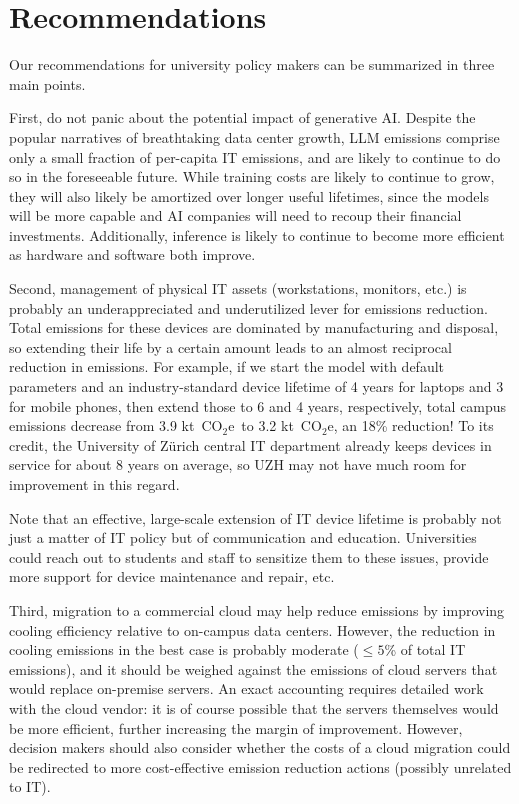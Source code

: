 \documentclass[11pt]{article}
\newcommand{\coe}{CO$_2$e}
\newcommand{\tcoe}{t~\coe}
\begin{document}
\section{Recommendations}
\label{sec:recommendations}

Our recommendations for university policy makers can be summarized in three main points.

First, do not panic about the potential impact of generative AI. Despite the popular narratives of breathtaking data center growth, LLM emissions comprise only a small fraction of per-capita IT emissions, and are likely to continue to do so in the foreseeable future. While training costs are likely to continue to grow, they will also likely be amortized over longer useful lifetimes, since the models will be more capable and AI companies will need to recoup their financial investments. Additionally, inference is likely to continue to become more efficient as hardware and software both improve.

Second, management of physical IT assets (workstations, monitors, etc.) is probably an underappreciated and underutilized lever for emissions reduction. Total emissions for these devices are dominated by manufacturing and disposal, so extending their life by a certain amount leads to an almost reciprocal reduction in emissions. For example, if we start the model with default parameters and an industry-standard device lifetime of 4 years for laptops and 3 for mobile phones, then extend those to 6 and 4 years, respectively, total campus emissions decrease from 3.9 k\tcoe\ to 3.2 k\tcoe, an 18\% reduction! To its credit, the University of Zürich central IT department already keeps devices in service for about 8 years on average, so UZH may not have much room for improvement in this regard.

Note that an effective, large-scale extension of IT device lifetime is probably not just a matter of IT policy but of communication and education. Universities could reach out to students and staff to sensitize them to these issues, provide more support for device maintenance and repair, etc.

Third, migration to a commercial cloud may help reduce emissions by improving cooling efficiency relative to on-campus data centers. However, the reduction in cooling emissions in the best case is probably moderate ($\le 5$\% of total IT emissions), and it should be weighed against the emissions of cloud servers that would replace on-premise servers. An exact accounting requires detailed work with the cloud vendor: it is of course possible that the servers themselves would be more efficient, further increasing the margin of improvement. However, decision makers should also consider whether the costs of a cloud migration could be redirected to more cost-effective emission reduction actions (possibly unrelated to IT).
\end{document}

